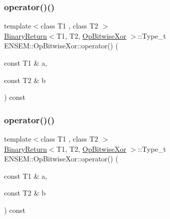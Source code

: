 \subsubsection{\texorpdfstring{operator()()}{operator()()}\hspace{0.1cm}{\footnotesize\ttfamily [1/3]}}
{\footnotesize\ttfamily template$<$class T1 , class T2 $>$ \\
\mbox{\hyperlink{structENSEM_1_1BinaryReturn}{Binary\+Return}}$<$T1, T2, \mbox{\hyperlink{structENSEM_1_1OpBitwiseXor}{Op\+Bitwise\+Xor}} $>$\+::Type\+\_\+t E\+N\+S\+E\+M\+::\+Op\+Bitwise\+Xor\+::operator() (\begin{DoxyParamCaption}\item[{const T1 \&}]{a,  }\item[{const T2 \&}]{b }\end{DoxyParamCaption}) const\hspace{0.3cm}{\ttfamily [inline]}}

\mbox{\label{structENSEM_1_1OpBitwiseXor_a591fa418b54f1df31f5b4120860f1e42}} 
\subsubsection{\texorpdfstring{operator()()}{operator()()}\hspace{0.1cm}{\footnotesize\ttfamily [2/3]}}
{\footnotesize\ttfamily template$<$class T1 , class T2 $>$ \\
\mbox{\hyperlink{structENSEM_1_1BinaryReturn}{Binary\+Return}}$<$T1, T2, \mbox{\hyperlink{structENSEM_1_1OpBitwiseXor}{Op\+Bitwise\+Xor}} $>$\+::Type\+\_\+t E\+N\+S\+E\+M\+::\+Op\+Bitwise\+Xor\+::operator() (\begin{DoxyParamCaption}\item[{const T1 \&}]{a,  }\item[{const T2 \&}]{b }\end{DoxyParamCaption}) const\hspace{0.3cm}{\ttfamily [inline]}}

\mbox{\label{structENSEM_1_1OpBitwiseXor_a591fa418b54f1df31f5b4120860f1e42}} 
